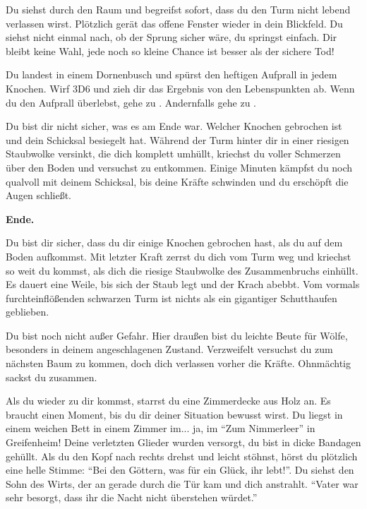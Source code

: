 Du siehst durch den Raum und begreifst sofort, dass du den Turm nicht lebend verlassen wirst. Plötzlich gerät das offene Fenster wieder in dein Blickfeld. Du siehst nicht einmal nach, ob der Sprung sicher wäre, du springst einfach. Dir bleibt keine Wahl, jede noch so kleine Chance ist besser als der sichere Tod!

Du landest in einem Dornenbusch und spürst den heftigen Aufprall in jedem Knochen. Wirf 3D6 und zieh dir das Ergebnis von den Lebenspunkten ab. Wenn du den Aufprall überlebst, gehe zu . Andernfalls gehe zu .


Du bist dir nicht sicher, was es am Ende war. Welcher Knochen gebrochen ist und dein Schicksal besiegelt hat. Während der Turm hinter dir in einer riesigen Staubwolke versinkt, die dich komplett umhüllt, kriechst du voller Schmerzen über den Boden und versuchst zu entkommen. Einige Minuten kämpfst du noch qualvoll mit deinem Schicksal, bis deine Kräfte schwinden und du erschöpft die Augen schließt.

\textbf{Ende.}


Du bist dir sicher, dass du dir einige Knochen gebrochen hast, als du auf dem Boden aufkommst. Mit letzter Kraft zerrst du dich vom Turm weg und kriechst so weit du kommst, als dich die riesige Staubwolke des Zusammenbruchs einhüllt. Es dauert eine Weile, bis sich der Staub legt und der Krach abebbt. Vom vormals furchteinflößenden schwarzen Turm ist nichts als ein gigantiger Schutthaufen geblieben.

Du bist noch nicht außer Gefahr. Hier draußen bist du leichte Beute für Wölfe, besonders in deinem angeschlagenen Zustand. Verzweifelt versuchst du zum nächsten Baum zu kommen, doch dich verlassen vorher die Kräfte. Ohnmächtig sackst du zusammen.

Als du wieder zu dir kommst, starrst du eine Zimmerdecke aus Holz an. Es braucht einen Moment, bis du dir deiner Situation bewusst wirst. Du liegst in einem weichen Bett in einem Zimmer im... ja, im ``Zum Nimmerleer'' in Greifenheim! Deine verletzten Glieder wurden versorgt, du bist in dicke Bandagen gehüllt. Als du den Kopf nach rechts drehst und leicht stöhnst, hörst du plötzlich eine helle Stimme: ``Bei den Göttern, was für ein Glück, ihr lebt!''. Du siehst den Sohn des Wirts, der an gerade durch die Tür kam und dich anstrahlt. ``Vater war sehr besorgt, dass ihr die Nacht nicht überstehen würdet.''

